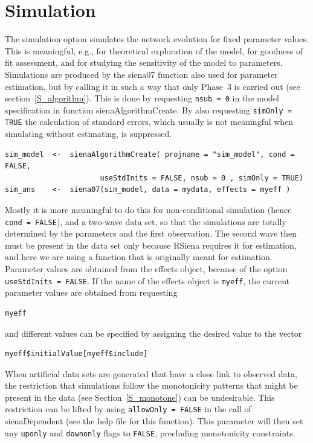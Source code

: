 \documentclass[a4paper,fleqn,11pt]{article}
\newcommand{\+}{\, + \,}
\newcommand{\RS}{{\sf \textsf{RSiena} }}
\begin{document}
\newpage
\section{Simulation}
\label{S_sim}

The simulation option simulates the network evolution for fixed
parameter values. This is meaningful, e.g., for theoretical
exploration of the model, for goodness of fit assessment,
and for studying the sensitivity of the model to parameters.
Simulations are produced by the \textsf{siena07} function
also used for parameter estimation, but by calling it in
such a way that only Phase~3 is carried out
(see section~\ref{S_algorithm}).
This is done by requesting \texttt{nsub = 0} in
the model specification in function \textsf{sienaAlgorithmCreate}.
By also requesting \texttt{simOnly = TRUE} the calculation
of standard errors, which usually is not meaningful when
simulating without estimating, is suppressed.
\begin{verbatim}
sim_model  <-  sienaAlgorithmCreate( projname = "sim_model", cond = FALSE,
                      useStdInits = FALSE, nsub = 0 , simOnly = TRUE)
sim_ans    <-  siena07(sim_model, data = mydata, effects = myeff )
\end{verbatim}
Mostly it is more meaningful to do this for non-conditional simulation
(hence \texttt{cond = FALSE}), and a two-wave data set,
so that the simulations are totally determined
by the parameters and the first observation.
The second wave then must be present in the data set only
because \RS requires it for estimation,
and here we are using a function that is originally
meant for estimation.
Parameter values are obtained from the effects object,
because of the option \texttt{useStdInits = FALSE}.
If the name of the effects object is \texttt{myeff},
the current parameter values are obtained from requesting
\begin{verbatim}
myeff
\end{verbatim}
and different values can be specified by assigning the
desired value to the vector
\begin{verbatim}
myeff$initialValue[myeff$include]
\end{verbatim}

When artificial data sets are generated that have a close link to observed data,
the restriction that simulations follow the monotonicity patterns that
might be present in the data (see Section~\ref{S_monotone}) can be undesirable.
This restriction can be lifted by using \texttt{allowOnly = FALSE}
in the call of \textsf{sienaDependent} (see the help file for this function).
This parameter will then set any \texttt{uponly} and \texttt{downonly}
flags to \texttt{FALSE}, precluding monotonicity constraints.
\end{document}
